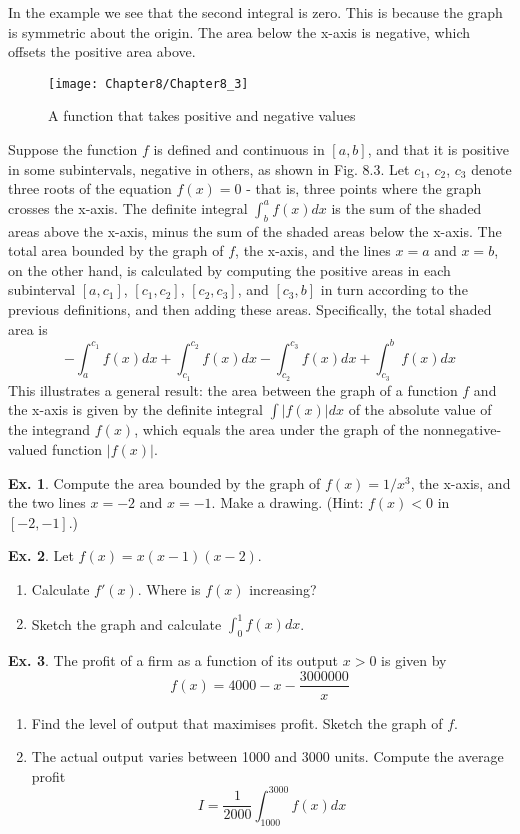 \documentclass[10pt,a4paper]{book}
\theoremstyle{definition}\newtheorem{definition}{Definition}
\theoremstyle{definition}\newtheorem{fact}{Fact}
\theoremstyle{definition}\newtheorem{ex}{Ex.}
\theoremstyle{definition}\newtheorem{project}{Project}
\theoremstyle{definition}\newtheorem{problem}{Problem}
\theoremstyle{definition}\newtheorem{example}{Example}
\numberwithin{theorem}{chapter}
\numberwithin{corollary}{chapter}
\numberwithin{assumption}{chapter}
\numberwithin{definition}{chapter}
\numberwithin{prop}{chapter}
\numberwithin{notation}{chapter}
\numberwithin{problem}{chapter}
\numberwithin{example}{chapter}
\numberwithin{fact}{chapter}
\numberwithin{ex}{chapter}
\begin{document}
	In the example we see that the second integral is zero. This is because the graph is symmetric about the origin. The area below the x-axis is negative, which offsets the positive area above.
	\begin{figure}
		\centering
		\texttt{[image: Chapter8/Chapter8\_3]}
		\caption{A function that takes positive and negative values}
	\end{figure}
	Suppose the function $f$ is defined and continuous in $[a, b]$, and that it is positive in some subintervals, negative in others, as shown in Fig. 8.3. Let $c_1$, $c_2$, $c_3$ denote three roots of the equation $f (x) = 0$ - that is, three points where the graph crosses the x-axis. The definite integral $\int_b^a f (x) dx$ is the sum of the shaded areas above the x-axis, minus the sum of the shaded areas below the x-axis. The total area bounded by the graph of $f$, the x-axis, and the lines $x = a$ and $x = b$, on the other hand, is calculated by computing the positive areas in each subinterval $[a, c_1]$, $[c_1, c_2]$, $[c_2, c_3]$, and $[c_3, b]$ in turn according to the previous definitions, and then adding these areas. Specifically, the total shaded area is
	$$-\int_a^{c_1} f(x) dx + \int_{c_1}^{c_2} f(x) dx - \int_{c_2}^{c_3} f(x)dx + \int_{c_3}^b f(x) dx$$
	This illustrates a general result: the area between the graph of a function $f$ and the x-axis is given by the definite integral $\int |f (x)| dx$ of the absolute value of the integrand $f (x)$, which equals the area under the graph of the nonnegative-valued function $|f (x)|$.
	
	\begin{ex}
		Compute the area bounded by the graph of $f(x) = 1/x^3$, the x-axis, and the two lines $x = -2$ and $x = -1$. Make a drawing. (Hint: $f (x) < 0$ in $[-2, -1]$.)
	\end{ex}
	
	\begin{ex}
		Let $f(x)=x(x-1)(x-2)$.
		\begin{enumerate}[label=(\alph*)]
			\item Calculate $f'(x)$. Where is $f(x)$ increasing?
			\item Sketch the graph and calculate $\int_0^1 f(x)dx$.
		\end{enumerate}
	\end{ex}
	
	\begin{ex}
		The profit of a firm as a function of its output $x>0$ is given by
		$$f(x) = 4000 - x - \frac{3000000}{x} $$
		\begin{enumerate}[label=(\alph*)]
			\item Find the level of output that maximises profit. Sketch the graph of $f$.
			\item The actual output varies between 1000 and 3000 units. Compute the average profit
			$$I = \frac{1}{2000} \int_{1000}^{3000} f(x) dx$$
		\end{enumerate}
	\end{ex}
	
\end{document}
